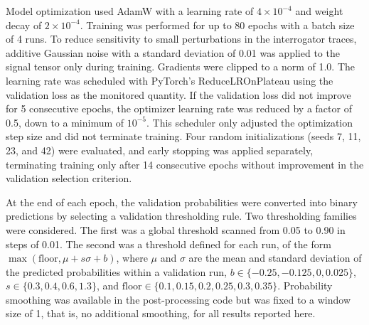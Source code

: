 \documentclass[fleqn,10pt]{wlscirep}
\begin{document}
Model optimization used AdamW with a learning rate of $4\times10^{-4}$ and weight decay of $2\times10^{-4}$. Training was performed for up to 80 epochs with a batch size of 4 runs. To reduce sensitivity to small perturbations in the interrogator traces, additive Gaussian noise with a standard deviation of 0.01 was applied to the signal tensor only during training. Gradients were clipped to a norm of 1.0. The learning rate was scheduled with PyTorch's ReduceLROnPlateau using the validation loss as the monitored quantity. If the validation loss did not improve for 5 consecutive epochs, the optimizer learning rate was reduced by a factor of 0.5, down to a minimum of $10^{-5}$. This scheduler only adjusted the optimization step size and did not terminate training. Four random initializations (seeds 7, 11, 23, and 42) were evaluated, and early stopping was applied separately, terminating training only after 14 consecutive epochs without improvement in the validation selection criterion.

At the end of each epoch, the validation probabilities were converted into binary predictions by selecting a validation thresholding rule. Two thresholding families were considered. The first was a global threshold scanned from 0.05 to 0.90 in steps of 0.01. The second was a threshold defined for each run, of the form $\max(\mathrm{floor}, \mu + s\sigma + b)$, where $\mu$ and $\sigma$ are the mean and standard deviation of the predicted probabilities within a validation run, $b\in\{-0.25,-0.125,0,0.025\}$, $s\in\{0.3,0.4,0.6,1.3\}$, and $\mathrm{floor}\in\{0.1,0.15,0.2,0.25,0.3,0.35\}$. Probability smoothing was available in the post-processing code but was fixed to a window size of 1, that is, no additional smoothing, for all results reported here.
\end{document}
